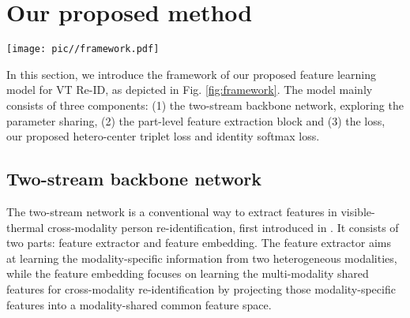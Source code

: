 \documentclass[journal]{IEEEtran}
\begin{document}
\section{Our proposed method}
\label{sec:method}
\begin{figure*}
\centering
\texttt{[image: pic//framework.pdf]}
\caption{The pipeline of our proposed framework for VT Re-ID, which mainly contains three components: two-stream backbone network, part-level feature learning block and loss. The two-stream backbone network includes two modality-specific branches with independent parameters and follows one modality-shared branch with shared parameters. For example, we take the ResNet50 model as the backbone, the first two stages ($stage0$ and $stage1$) form the modality-specific branches and the following three stages ($stage2$, $stage3$ and $stage4$) form the modality-shared branch.
Then, the feature map outputted from the backbone is horizontally split into $p$ 3D tensors, here $p=4$, which are pooled into vectors by generalized-mean ($GeM$) pooling operation. For each part vector, a $1 \times 1$ Conv block reduces the dimension of features. Afterward, the reduced part features are respectively input to compute the identification loss $L_{id}$ and our proposed hetero-center triplet loss $L_{hc\_tri}$. Finally, all the part features are concatenated ($cat$) to form the final person features, which is supervised by $L_{hc\_tri}$. }
\label{fig:framework}
\end{figure*}
In this section, we introduce the framework of our proposed feature learning model for VT Re-ID, as depicted in Fig. \ref{fig:framework}. The model mainly consists of three components: (1) the two-stream backbone network, exploring the parameter sharing, (2) the part-level feature extraction block and (3) the loss, our proposed hetero-center triplet loss and identity softmax loss.

\subsection{Two-stream backbone network}
\label{ssec:backbone}
The two-stream network is a conventional way to extract features in visible-thermal cross-modality person re-identification, first introduced in \cite{ye2018visible}. It consists of two parts: feature extractor and feature embedding. The feature extractor aims at learning the modality-specific information from two heterogeneous modalities, while the feature embedding focuses on learning the multi-modality shared features for cross-modality re-identification by projecting those modality-specific features into a modality-shared common feature space.
\end{document}
